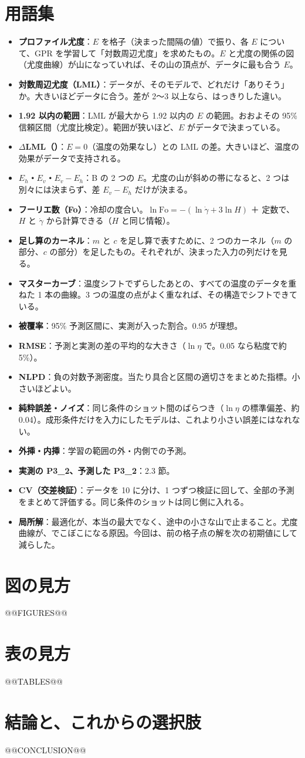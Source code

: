 \documentclass[paper=a4paper,fontsize=10.5pt,line_length=44zw,number_of_lines=38]{jlreq}
\newcommand{\file}[1]{\texttt{\detokenize{#1}}}
\newcommand{\gd}{\dot{\gamma}}
\newcommand{\Eh}{E_{h}}
\newcommand{\Ev}{E_{v}}
\newcommand{\PII}{P3\_2}
\newenvironment{termlist}{\begin{itemize}[label=・,leftmargin=1\zw,labelwidth=1\zw,labelsep=0pt,itemsep=0.4ex,topsep=0.6ex,parsep=0pt]}{\end{itemize}}
\newcommand{\term}[1]{\item \textbf{#1}：}
\begin{document}
\section{用語集}
\begin{termlist}
\term{プロファイル尤度}$E$ を格子（決まった間隔の値）で振り、各 $E$ について、GPR を学習して「対数周辺尤度」を求めたもの。$E$ と尤度の関係の図（尤度曲線）が山になっていれば、その山の頂点が、データに最も合う $E$。
\term{対数周辺尤度（LML）}データが、そのモデルで、どれだけ「ありそう」か。大きいほどデータに合う。差が 2〜3 以上なら、はっきりした違い。
\term{1.92 以内の範囲}LML が最大から 1.92 以内の $E$ の範囲。おおよその 95\% 信頼区間（尤度比検定）。範囲が狭いほど、$E$ がデータで決まっている。
\term{$\Delta$LML（\file{dLML_vs_E0}）}$E=0$（温度の効果なし）との LML の差。大きいほど、温度の効果がデータで支持される。
\term{$\Eh$・$\Ev$・$E_v-E_h$}B の 2 つの $E$。尤度の山が斜めの帯になると、2 つは別々には決まらず、差 $E_v-E_h$ だけが決まる。
\term{フーリエ数（Fo）}冷却の度合い。$\ln\mathrm{Fo}=-(\ln\gd+3\ln H)$ ＋ 定数で、$H$ と $\gd$ から計算できる（$H$ と同じ情報）。
\term{足し算のカーネル}$m$ と $c$ を足し算で表すために、2 つのカーネル（$m$ の部分、$c$ の部分）を足したもの。それぞれが、決まった入力の列だけを見る。
\term{マスターカーブ}温度シフトでずらしたあとの、すべての温度のデータを重ねた 1 本の曲線。3 つの温度の点がよく重なれば、その構造でシフトできている。
\term{被覆率}95\% 予測区間に、実測が入った割合。0.95 が理想。
\term{RMSE}予測と実測の差の平均的な大きさ（$\ln\eta$ で。0.05 なら粘度で約 5\%）。
\term{NLPD}負の対数予測密度。当たり具合と区間の適切さをまとめた指標。小さいほどよい。
\term{純粋誤差・ノイズ}同じ条件のショット間のばらつき（$\ln\eta$ の標準偏差、約 0.04）。成形条件だけを入力にしたモデルは、これより小さい誤差にはなれない。
\term{外挿・内挿}学習の範囲の外・内側での予測。
\term{実測の \PII、予測した \PII}2.3 節。
\term{CV（交差検証）}データを 10 に分け、1 つずつ検証に回して、全部の予測をまとめて評価する。同じ条件のショットは同じ側に入れる。
\term{局所解}最適化が、本当の最大でなく、途中の小さな山で止まること。尤度曲線が、でこぼこになる原因。今回は、前の格子点の解を次の初期値にして減らした。
\end{termlist}

\section{図の見方}

@@FIGURES@@

\section{表の見方}

@@TABLES@@

\section{結論と、これからの選択肢}

@@CONCLUSION@@
\end{document}
